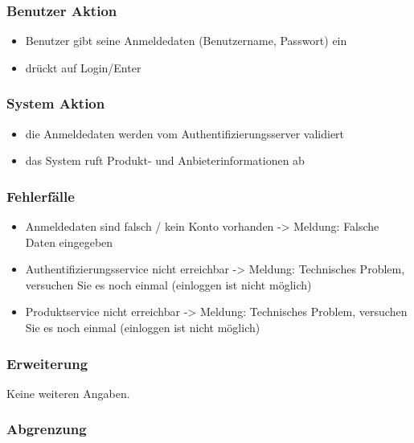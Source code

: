 \documentclass[a4paper,12pt]{article}
\begin{document}
\subsubsection{Benutzer Aktion}\label{benutzer-aktion}

\begin{itemize}
\item
  Benutzer gibt seine Anmeldedaten (Benutzername, Passwort) ein
\item
  drückt auf Login/Enter
\end{itemize}

\subsubsection{System Aktion}\label{system-aktion}

\begin{itemize}
\item
  die Anmeldedaten werden vom Authentifizierungsserver validiert
\item
  das System ruft Produkt- und Anbieterinformationen ab
\end{itemize}

\subsubsection{Fehlerfälle}\label{fehlerfalle}

\begin{itemize}
\item
  Anmeldedaten sind falsch / kein Konto vorhanden -\textgreater{}
  Meldung: Falsche Daten eingegeben
\item
  Authentifizierungsservice nicht erreichbar -\textgreater{} Meldung:
  Technisches Problem, versuchen Sie es noch einmal (einloggen ist nicht
  möglich)
\item
  Produktservice nicht erreichbar -\textgreater{} Meldung: Technisches
  Problem, versuchen Sie es noch einmal (einloggen ist nicht möglich)
\end{itemize}

\subsubsection{Erweiterung}\label{erweiterung}
Keine weiteren Angaben.

\subsubsection{Abgrenzung}\label{abgrenzung}
\end{document}
